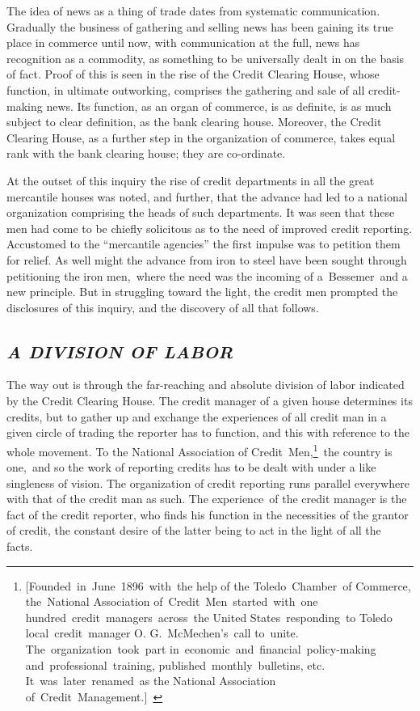 \documentclass[twoside,symmetric,nobib,justified]{tufte-book}
\begin{document}
The idea of news as a thing of trade dates from systematic
communication. Gradually the business of gathering and selling news has
been gaining its true place in commerce until now, with communication at
the full, news has recognition as a commodity, as something to be
universally dealt in on the basis of fact. Proof of this is seen in the
rise of the Credit Clearing House, whose function, in ultimate
outworking, comprises the gathering and sale of all credit-making news.
Its function, as an organ of commerce, is as definite, is as much
subject to clear definition, as the bank clearing house. Moreover, the
Credit Clearing House, as a further step in the organization of
commerce, takes equal rank with the bank clearing house; they are
co-ordinate.~

At the outset of this inquiry the rise of credit departments in all the
great mercantile houses was noted, and further, that the advance had led
to a national organization comprising the heads of such departments. It
was seen that these men had come to be chiefly solicitous as to the need
of improved credit reporting. Accustomed to the ``mercantile agencies''
the first impulse was to petition them for relief. As well might the
advance from iron to steel have been sought through petitioning the iron
men,~where the need was the incoming of a~Bessemer~and a new principle.
But in struggling toward the light, the credit men prompted the
disclosures of this inquiry, and the discovery of all that follows.~

\hypertarget{a-division-of-labor}{%
\subsection{\texorpdfstring{\emph{A DIVISION OF
LABOR}~}{A DIVISION OF LABOR~}}\label{a-division-of-labor}}

The way out is through the far-reaching and absolute division of labor
indicated by the Credit Clearing House. The credit manager of a given
house determines its credits, but to gather up and exchange the
experiences of all credit man in a given circle of trading the reporter
has to function, and this with reference to the whole movement. To the
National Association of Credit~Men,\footnote{{[}Founded~in~June~1896~with~the
  help of the Toledo~Chamber~of Commerce, the~National Association
  of~Credit~Men~started~with~one hundred~credit~managers~across~the
  United States~responding~to Toledo local~credit~manager O.
  G.~McMechen's~call to~unite. The~organization~took~part
  in~economic~and~financial~policy-making and~professional~training,
  published~monthly~bulletins, etc. It~was~later~renamed~as the National
  Association of~Credit~Management.{]}~}~the country is one,~and so the
work of reporting credits has to be dealt with under a like singleness
of vision. The organization of credit reporting runs parallel everywhere
with that of the credit man as such. The experience~of the credit
manager is the fact of the credit reporter, who finds his function in
the necessities of the grantor of credit, the constant desire of the
latter being to act in the light of all the facts.~
\end{document}
